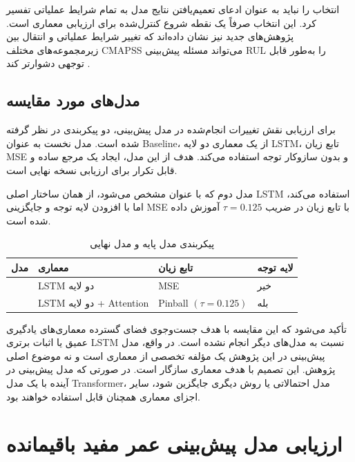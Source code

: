 انتخاب  را نباید به عنوان ادعای تعمیم‌یافتن نتایج مدل به تمام شرایط عملیاتی تفسیر کرد. این انتخاب صرفاً یک نقطه شروع کنترل‌شده برای ارزیابی معماری است. پژوهش‌های جدید نیز نشان داده‌اند که تغییر شرایط عملیاتی و انتقال بین زیرمجموعه‌های مختلف CMAPSS می‌تواند مسئله پیش‌بینی \gls{RUL} را به‌طور قابل توجهی دشوارتر کند \cite{diao2026reliable,song2026degradation}.

\subsection{مدل‌های مورد مقایسه}

برای ارزیابی نقش تغییرات انجام‌شده در مدل پیش‌بینی، دو پیکربندی در نظر گرفته شده است. مدل نخست به عنوان \gls{Baseline}، از یک معماری دو لایه LSTM، تابع زیان MSE و بدون سازوکار توجه استفاده می‌کند. هدف از این مدل، ایجاد یک مرجع ساده و قابل تکرار برای ارزیابی نسخه نهایی است.

مدل دوم که با عنوان  مشخص می‌شود، از همان ساختار اصلی LSTM استفاده می‌کند، اما با افزودن لایه توجه و جایگزینی MSE با تابع زیان  در ضریب $\tau=0.125$ آموزش داده شده است.

\begin{table}[ht]
	\centering
	\caption{پیکربندی مدل پایه و مدل نهایی}
	\label{tab:models-evaluation}
	\begin{tabular}{p{4cm}p{4cm}p{3cm}p{3cm}}
		\toprule
		\textbf{مدل} & \textbf{معماری} & \textbf{تابع زیان} & \textbf{لایه توجه} \\
		\midrule
		\lr{Baseline} & LSTM دو لایه & MSE & خیر \\
		\lr{V2} & LSTM دو لایه + Attention & Pinball $(\tau=0.125)$ & بله \\
		\bottomrule
	\end{tabular}
\end{table}

تأکید می‌شود که این مقایسه با هدف جست‌وجوی فضای گسترده معماری‌های یادگیری عمیق یا اثبات برتری LSTM نسبت به مدل‌های دیگر انجام نشده است. در واقع، مدل پیش‌بینی در این پژوهش یک مؤلفه تخصصی از معماری است و نه موضوع اصلی پژوهش. این تصمیم با هدف معماری سازگار است. در صورتی که مدل پیش‌بینی در آینده با یک مدل \gls{Transformer}، مدل احتمالاتی یا روش دیگری جایگزین شود، سایر اجزای معماری همچنان قابل استفاده خواهند بود.

\section{ارزیابی مدل پیش‌بینی عمر مفید باقیمانده}
\label{sec:rul-results}

